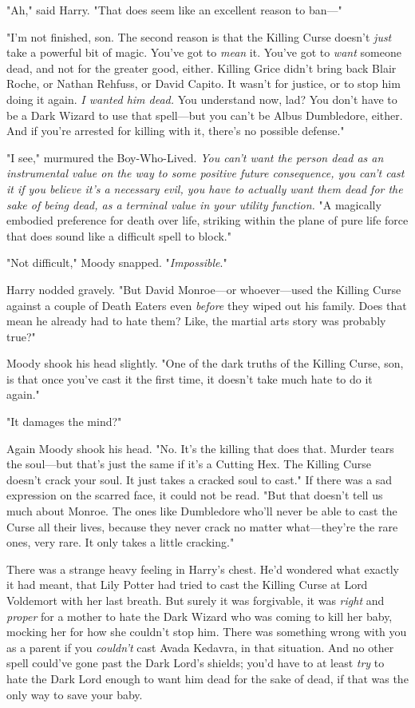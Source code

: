 "Ah," said Harry. "That does seem like an excellent reason to ban---"

"I'm not finished, son. The second reason is that the Killing Curse doesn't
\emph{just} take a powerful bit of magic. You've got to \emph{mean} it. You've
got to \emph{want} someone dead, and not for the greater good, either. Killing
Grice didn't bring back Blair Roche, or Nathan Rehfuss, or David Capito. It
wasn't for justice, or to stop him doing it again. \emph{I wanted him dead.}
You understand now, lad? You don't have to be a Dark Wizard to use that
spell---but you can't be Albus Dumbledore, either. And if you're arrested for
killing with it, there's no possible defense."

"I{\el} see," murmured the Boy-Who-Lived. \emph{You can't want the person
dead as an instrumental value on the way to some positive future consequence,
you can't cast it if you believe it's a necessary evil, you have to actually
want them dead for the sake of being dead, as a terminal value in your utility
function.} "A magically embodied preference for death over life, striking
within the plane of pure life force{\el} that does sound like a difficult
spell to block."

"Not difficult," Moody snapped. "\emph{Impossible}."

Harry nodded gravely. "But David Monroe---or whoever---used the Killing Curse
against a couple of Death Eaters even \emph{before} they wiped out his family.
Does that mean he already had to hate them? Like, the martial arts story was
probably true?"

Moody shook his head slightly. "One of the dark truths of the Killing Curse,
son, is that once you've cast it the first time, it doesn't take much hate to
do it again."

"It damages the mind?"

Again Moody shook his head. "No. It's the killing that does that. Murder tears
the soul---but that's just the same if it's a Cutting Hex. The Killing Curse
doesn't crack your soul. It just takes a cracked soul to cast." If there was a
sad expression on the scarred face, it could not be read. "But that doesn't
tell us much about Monroe. The ones like Dumbledore who'll never be able to
cast the Curse all their lives, because they never crack no matter
what---they're the rare ones, very rare. It only takes a little cracking."

There was a strange heavy feeling in Harry's chest. He'd wondered what exactly
it had meant, that Lily Potter had tried to cast the Killing Curse at Lord
Voldemort with her last breath. But surely it was forgivable, it was
\emph{right} and \emph{proper} for a mother to hate the Dark Wizard who was
coming to kill her baby, mocking her for how she couldn't stop him. There was
something wrong with you as a parent if you \emph{couldn't} cast Avada Kedavra,
in that situation. And no other spell could've gone past the Dark Lord's
shields; you'd have to at least \emph{try} to hate the Dark Lord enough to want
him dead for the sake of dead, if that was the only way to save your baby.


